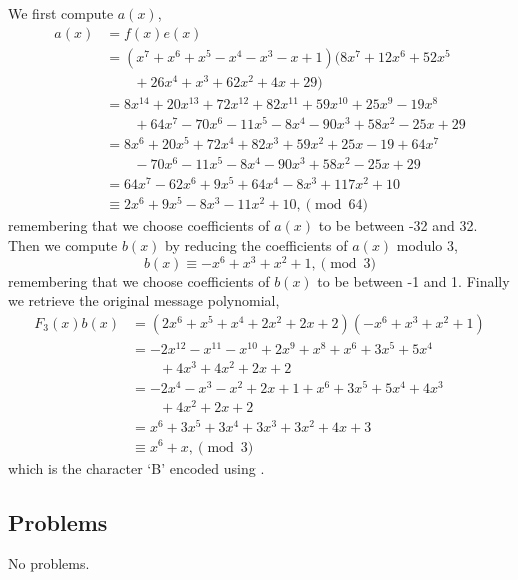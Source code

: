 \begin{questions}
    \item We first compute $a(x)$,
    \begin{align*}
        a(x) &= f(x)e(x)\\
        &= (x^7 +x^6 +x^5 -x^4 -x^3 -x + 1)(8x^7 + 12x^6 + 52x^5\\
        &\quad\quad+ 26x^4 +x^3 + 62x^2 + 4x + 29)\\
        &= 8x^{14} + 20x^{13} + 72x^{12} + 82x^{11} + 59x^{10} + 25x^9 - 19x^8\\
        &\quad\quad+ 64x^7 - 70x^6 - 11x^5 - 8x^4 - 90x^3 + 58x^2 - 25x + 29\\
        &= 8x^6 + 20x^5 + 72x^4 + 82x^3 + 59x^2 + 25x - 19 + 64x^7\\
        &\quad\quad- 70x^6 - 11x^5 - 8x^4 - 90x^3 + 58x^2 - 25x + 29\\
        &= 64x^7 - 62x^6 + 9x^5 + 64x^4 - 8x^3 + 117x^2 + 10\\
        &\equiv 2x^6 + 9x^5 - 8x^3 - 11x^2 + 10, \pmod{64}
    \end{align*}
    remembering that we choose coefficients of $a(x)$ to be between -32 and 32. Then we compute $b(x)$ by reducing the coefficients of $a(x)$ modulo 3,
    \[
        b(x) \equiv -x^6 + x^3 + x^2 + 1, \pmod{3}
    \]
    remembering that we choose coefficients of $b(x)$ to be between -1 and 1. Finally we retrieve the original message polynomial,
    \begin{align*}
        F_3(x)b(x) &= (2x^6 +x^5 +x^4 + 2x^2 + 2x + 2)(-x^6 + x^3 + x^2 + 1)\\
        &= -2x^{12} - x^{11} - x^{10} + 2x^9 + x^8 + x^6 + 3x^5 + 5x^4\\
        &\quad\quad+ 4x^3 + 4x^2 + 2x + 2\\
        &= -2x^4 - x^3 - x^2 + 2x + 1 + x^6 + 3x^5 + 5x^4 + 4x^3\\
        &\quad\quad+ 4x^2 + 2x + 2\\
        &= x^6 + 3x^5 + 3x^4 + 3x^3 + 3x^2 + 4x + 3\\
        &\equiv x^6 + x, \pmod{3}
    \end{align*}
    which is the character `B' encoded using .
\end{questions}

\subsection*{Problems}
No problems.
